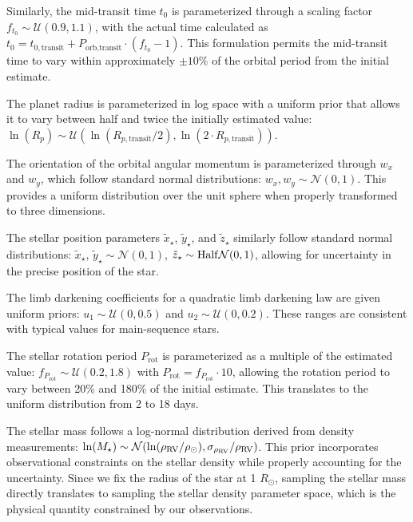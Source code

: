 \documentclass[twocolumn]{aastex631}
\begin{document}
Similarly, the mid-transit time $t_0$ is parameterized through a scaling factor $f_{t_0} \sim \mathcal{U}(0.9, 1.1)$, 
with the actual time calculated as $t_0 = t_{0,\text{transit}} + P_{\text{orb,transit}} \cdot (f_{t_0} - 1)$. 
This formulation permits the mid-transit time to vary within approximately $\pm10\%$ of the orbital period from the initial estimate.

The planet radius is parameterized in log space with a uniform prior that allows it to vary between half and twice the 
initially estimated value: $\ln(R_p) \sim \mathcal{U}(\ln(R_{p,\text{transit}}/2), \ln(2 \cdot R_{p,\text{transit}}))$.

The orientation of the orbital angular momentum is parameterized through $w_x$ and $w_y$, which follow standard normal 
distributions: $w_x, w_y \sim \mathcal{N}(0, 1)$. 
This provides a uniform distribution over the unit sphere when properly transformed to three dimensions.

The stellar position parameters $\tilde{x}_{\star}$, $\tilde{y}_{\star}$, and
$\tilde{z}_{\star}$ similarly follow standard normal distributions:
$\tilde{x}_{\star}$, $\tilde{y}_{\star} \sim \mathcal{N}(0,1)$, 
$\tilde{z}_{\star}\sim \rm Half\mathcal{N}(0,1)$, allowing for uncertainty in the precise position of the star.

The limb darkening coefficients for a quadratic limb darkening law are given uniform priors: 
$u_1 \sim \mathcal{U}(0, 0.5)$ and $u_2 \sim \mathcal{U}(0, 0.2)$. These ranges are consistent with typical values 
for main-sequence stars.

The stellar rotation period $P_{\text{rot}}$ is parameterized as a multiple of the estimated 
value: $f_{P_{\text{rot}}} \sim \mathcal{U}(0.2, 1.8)$ with $P_{\text{rot}} = f_{P_{\text{rot}}} 
\cdot 10$, allowing the rotation period to vary between 20\% and 180\% of the initial estimate. This translates to the uniform 
distribution from 2 to 18 days.

The stellar mass follows a log-normal distribution derived from density
measurements: $\ln(M_{\star}) \sim \mathcal{N}(\ln(\rho_{\rm RV} /
\rho_{\odot}), \sigma_{\rho_{\rm RV}} / \rho_{\rm RV})$. This prior incorporates observational constraints on the stellar 
density while properly accounting for the uncertainty. Since we fix the radius of the star at 1 $R_\odot$, sampling the 
stellar mass directly translates to sampling the stellar density parameter space, which is the physical quantity 
constrained by our observations. 
\end{document}
